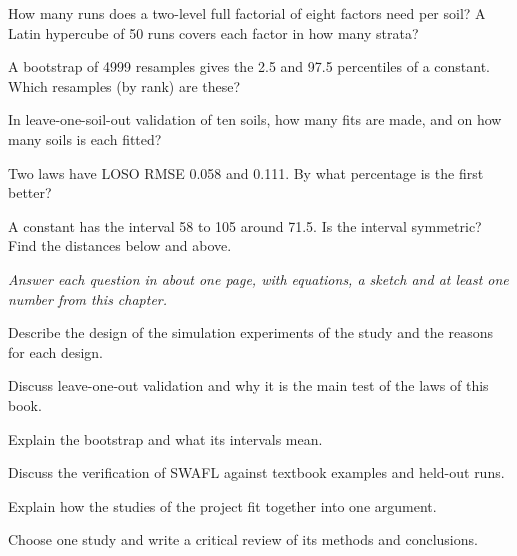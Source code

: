 \begin{exlist}
\item How many runs does a two-level full factorial of eight factors need per soil? A Latin hypercube of 50 runs covers each factor in how many strata?
\item A bootstrap of 4999 resamples gives the 2.5 and 97.5 percentiles of a constant. Which resamples (by rank) are these?
\item In leave-one-soil-out validation of ten soils, how many fits are made, and on how many soils is each fitted?
\item Two laws have LOSO RMSE 0.058 and 0.111. By what percentage is the first better?
\item A constant has the interval 58 to 105 around 71.5. Is the interval symmetric? Find the distances below and above.
\end{exlist}
{\small\itshape Answer each question in about one page, with equations, a sketch and at least one number from this chapter.}\par\vspace{3pt}
\begin{exlist}
\item Describe the design of the simulation experiments of the study and the reasons for each design.
\item Discuss leave-one-out validation and why it is the main test of the laws of this book.
\item Explain the bootstrap and what its intervals mean.
\item Discuss the verification of SWAFL against textbook examples and held-out runs.
\item Explain how the studies of the project fit together into one argument.
\item Choose one study and write a critical review of its methods and conclusions.
\end{exlist}
